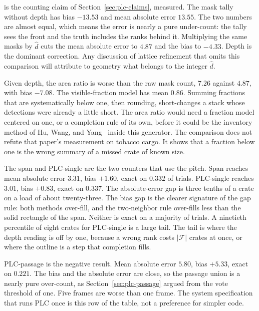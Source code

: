  is the counting claim of Section~\ref{sec:plc-claims}, measured. The mask tally without depth has bias $-13.53$ and mean absolute error $13.55$. The two numbers are almost equal, which means the error is nearly a pure under-count: the tally sees the front and the truth includes the ranks behind it. Multiplying the same masks by $\hat{d}$ cuts the mean absolute error to $4.87$ and the bias to $-4.33$. Depth is the dominant correction. Any discussion of lattice refinement that omits this comparison will attribute to geometry what belongs to the integer $\hat{d}$.

Given depth, the area ratio is worse than the raw mask count, $7.26$ against $4.87$, with bias $-7.08$. The visible-fraction model has mean $0.86$. Summing fractions that are systematically below one, then rounding, short-changes a stack whose detections were already a little short. The area ratio would need a fraction model centered on one, or a completion rule of its own, before it could be the inventory method of Hu, Wang, and Yang~\cite{hu2025arbca} inside this generator. The comparison does not refute that paper's measurement on tobacco cargo. It shows that a fraction below one is the wrong summary of a missed crate of known size.

The span and PLC-single are the two counters that use the pitch. Span reaches mean absolute error $3.31$, bias $+1.60$, exact on $0.332$ of trials. PLC-single reaches $3.01$, bias $+0.83$, exact on $0.337$. The absolute-error gap is three tenths of a crate on a load of about twenty-three. The bias gap is the clearer signature of the gap rule: both methods over-fill, and the two-neighbor rule over-fills less than the solid rectangle of the span. Neither is exact on a majority of trials. A ninetieth percentile of eight crates for PLC-single is a large tail. The tail is where the depth reading is off by one, because a wrong rank costs $\lvert\mathcal{F}\rvert$ crates at once, or where the outline is a step that completion fills.

PLC-passage is the negative result. Mean absolute error $5.80$, bias $+5.33$, exact on $0.221$. The bias and the absolute error are close, so the passage union is a nearly pure over-count, as Section~\ref{sec:plc-passage} argued from the vote threshold of one. Five frames are worse than one frame. The system specification that runs PLC once is this row of the table, not a preference for simpler code.

